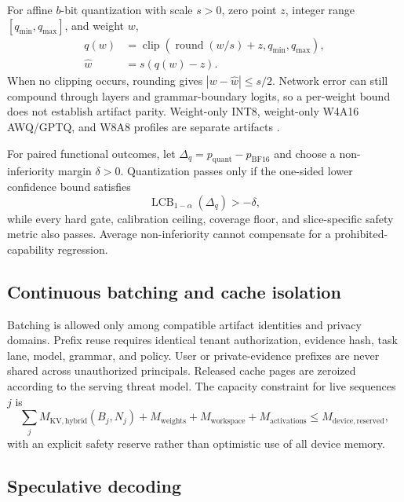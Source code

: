 \documentclass[10pt,letterpaper]{article}
\newcommand{\1}{\mathbb{1}}
\newcommand{\clip}{\operatorname{clip}}
\begin{document}
For affine $b$-bit quantization with scale $s>0$, zero point $z$, integer range
$[q_{\min},q_{\max}]$, and weight $w$,
\begin{align}
  q(w)&=\clip\!\left(\operatorname{round}(w/s)+z,q_{\min},q_{\max}\right),\\
  \widehat w&=s(q(w)-z).
  \label{eq:affine-quant}
\end{align}
When no clipping occurs, rounding gives $|w-\widehat w|\le s/2$.  Network error can still compound
through layers and grammar-boundary logits, so a per-weight bound does not establish artifact parity.
Weight-only INT8, weight-only W4A16 AWQ/GPTQ, and W8A8 profiles are separate artifacts
\cite{frantar2023gptq,lin2024awq,xiao2023smoothquant}.

For paired functional outcomes, let $\Delta_q=p_{\mathrm{quant}}-p_{\mathrm{BF16}}$ and choose a
non-inferiority margin $\delta>0$.  Quantization passes only if the one-sided lower confidence bound
satisfies
\begin{equation}
  \operatorname{LCB}_{1-\alpha}(\Delta_q)>-\delta,
  \label{eq:quant-ni}
\end{equation}
while every hard gate, calibration ceiling, coverage floor, and slice-specific safety metric also
passes.  Average non-inferiority cannot compensate for a prohibited-capability regression.

\subsection{Continuous batching and cache isolation}

Batching is allowed only among compatible artifact identities and privacy domains.  Prefix reuse
requires identical tenant authorization, evidence hash, task lane, model, grammar, and policy.  User
or private-evidence prefixes are never shared across unauthorized principals.  Released cache pages
are zeroized according to the serving threat model.  The capacity constraint for live sequences $j$
is
\begin{equation}
  \sum_j M_{\mathrm{KV,hybrid}}(B_j,N_j)
  +M_{\mathrm{weights}}+M_{\mathrm{workspace}}+M_{\mathrm{activations}}
  \le M_{\mathrm{device,reserved}},
  \label{eq:serving-memory}
\end{equation}
with an explicit safety reserve rather than optimistic use of all device memory.

\subsection{Speculative decoding}
\end{document}

